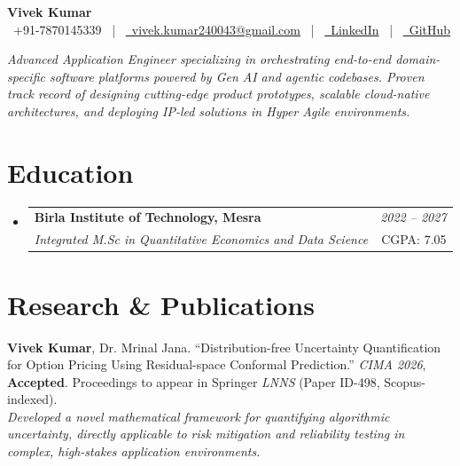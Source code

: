 \documentclass[a4paper,10pt]{article}
\makeatletter
\newcommand{\resumeSubheading}[4]{\vspace{0.5mm}\item
    \begin{tabular*}{0.98\textwidth}[t]{l@{\extracolsep{\fill}}r}
        \textbf{#1} & \textit{\footnotesize{#4}} \\
        \textit{\footnotesize{#3}} &  \footnotesize{#2}
    \end{tabular*}
}
\newcommand{\resumeSubHeadingListStart}{\begin{itemize}[leftmargin=*,labelsep=0mm]}
\newcommand{\resumeSubHeadingListEnd}{\end{itemize}\vspace{1mm}}
\makeatother
\begin{document}
\selectfont

\begin{center}
    {\Huge \textbf{Vivek Kumar}} \\ \vspace{2mm}
    \faPhone\ +91-7870145339 ~|~
    \href{mailto:vivek.kumar240043@gmail.com}{\faEnvelope\ vivek.kumar240043@gmail.com} ~|~
    \href{https://in.linkedin.com/in/vivek-kumar-3556412a0}{\faLinkedin\ LinkedIn} ~|~
    \href{https://github.com/KalWardin-Dronzer}{\faGithub\ GitHub}
\end{center}

\vspace{-2mm}
\begin{center}
\small \textit{Advanced Application Engineer specializing in orchestrating end-to-end domain-specific software platforms powered by Gen AI and agentic codebases. Proven track record of designing cutting-edge product prototypes, scalable cloud-native architectures, and deploying IP-led solutions in Hyper Agile environments.}
\end{center}

\section{Education}
\resumeSubHeadingListStart
    \resumeSubheading
      {Birla Institute of Technology, Mesra}{CGPA: 7.05}
      {Integrated M.Sc in Quantitative Economics and Data Science}{2022 -- 2027}
\resumeSubHeadingListEnd

\section{Research \& Publications}
\begin{itemize}[leftmargin=3ex, labelsep=1.2mm, itemsep=0mm]
    \small{\item \textbf{Vivek Kumar}, Dr. Mrinal Jana. ``Distribution-free Uncertainty Quantification for Option Pricing Using Residual-space Conformal Prediction.'' \textit{CIMA 2026}, \textbf{Accepted}. Proceedings to appear in Springer \textit{LNNS} (Paper ID-498, Scopus-indexed).
    \\ \vspace{1mm}
    \textit{Developed a novel mathematical framework for quantifying algorithmic uncertainty, directly applicable to risk mitigation and reliability testing in complex, high-stakes application environments.}}
\end{itemize}
\end{document}
